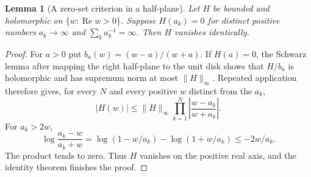 \documentclass[11pt]{article}
\newtheorem{lemma}[theorem]{Lemma}
\theoremstyle{definition}
\theoremstyle{remark}
\numberwithin{equation}{section}
\begin{document}
\begin{lemma}[A zero-set criterion in a half-plane]\label{lem:cm-zeros}
Let $H$ be bounded and holomorphic on $\{w:\operatorname{Re}w>0\}$.
Suppose $H(a_k)=0$ for distinct positive numbers $a_k\to\infty$ and
$\sum_k a_k^{-1}=\infty$.  Then $H$ vanishes identically.
\end{lemma}
\begin{proof}
For $a>0$ put $b_a(w)=(w-a)/(w+a)$.
If $H(a)=0$, the Schwarz lemma after mapping the right half-plane to
the unit disk shows that $H/b_a$ is holomorphic and has supremum norm
at most $\|H\|_\infty$.  Repeated application therefore gives, for every
$N$ and every positive $w$ distinct from the $a_k$,
\[
 |H(w)|\leq \|H\|_\infty
       \prod_{k=1}^N\left|\frac{w-a_k}{w+a_k}\right|.
\]
For $a_k>2w$,
\[
 \log\frac{a_k-w}{a_k+w}
 =\log(1-w/a_k)-\log(1+w/a_k)\leq-2w/a_k.
\]
The product tends to zero.  Thus $H$ vanishes on the positive real
axis, and the identity theorem finishes the proof.
\end{proof}
\end{document}
